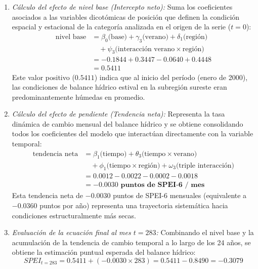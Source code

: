 \begin{enumerate}
    \item \textit{Cálculo del efecto de nivel base (Intercepto neto):} Suma los coeficientes asociados a las variables dicotómicas de posición que definen la condición espacial y estacional de la categoría analizada en el origen de la serie ($t = 0$):
    \begin{equation}
    \begin{split}
    \text{nivel base} & = \beta_0 \text{(base)} + \gamma_3 \text{(verano)} + \delta_1 \text{(región)} \\
    & \quad + \psi_3 \text{(interacción verano} \times \text{región)} \\
    & = -0.1844 + 0.3447 - 0.0640 + 0.4448 \\
    & = \mathbf{0.5411}
    \end{split}
    \label{eq:nivel_base}
    \end{equation}
    Este valor positivo ($0.5411$) indica que al inicio del período (enero de 2000), las condiciones de balance hídrico estival en la subregión sureste eran predominantemente húmedas en promedio.

    \item \textit{Cálculo del efecto de pendiente (Tendencia neta):} Representa la tasa dinámica de cambio mensual del balance hídrico y se obtiene consolidando todos los coeficientes del modelo que interactúan directamente con la variable temporal:
    \begin{equation}
    \begin{split}
    \text{tendencia neta} & = \beta_1 \text{(tiempo)} + \theta_3 \text{(tiempo} \times \text{verano)} \\
    & \quad + \phi_1 \text{(tiempo} \times \text{región)} + \omega_3 \text{(triple interacción)} \\
    & = 0.0012 - 0.0022 - 0.0002 - 0.0018 \\
    & = \mathbf{-0.0030 \text{ puntos de SPEI-6 / mes}}
    \end{split}
    \label{eq:tendencia_neta}
    \end{equation}
    Esta tendencia neta de $-0.0030$ puntos de SPEI-6 mensuales (equivalente a $-0.0360$ puntos por año) representa una trayectoria sistemática hacia condiciones estructuralmente más secas.

    \item \textit{Evaluación de la ecuación final al mes $t = 283$:} Combinando el nivel base y la acumulación de la tendencia de cambio temporal a lo largo de los 24 años, se obtiene la estimación puntual esperada del balance hídrico:
    \begin{equation}
        SPEI_{t=283} = 0.5411 + (-0.0030 \times 283) = 0.5411 - 0.8490 = \mathbf{-0.3079}
    \end{equation}
\end{enumerate}

